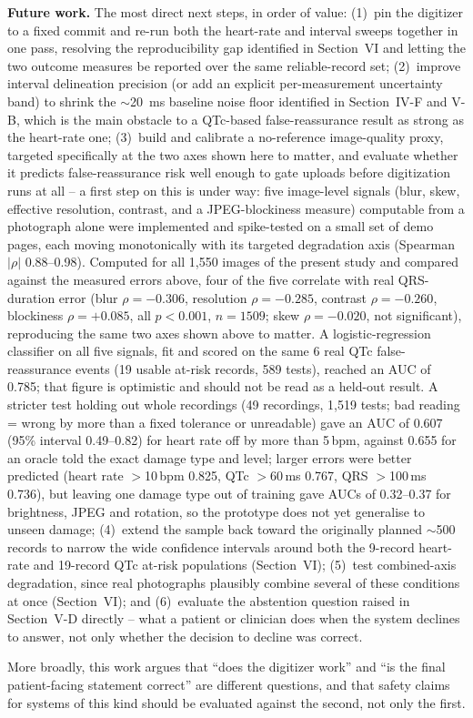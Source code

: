 \documentclass[conference]{IEEEtran}
\begin{document}
\textbf{Future work.} The most direct next steps, in order of value: (1)~pin the
digitizer to a fixed commit and re-run both the heart-rate and interval sweeps
together in one pass, resolving the reproducibility gap identified in Section~VI and
letting the two outcome measures be reported over the same reliable-record set;
(2)~improve interval delineation precision (or add an explicit per-measurement
uncertainty band) to shrink the $\sim$20~ms baseline noise floor identified in
Section~IV-F and V-B, which is the main obstacle to a QTc-based false-reassurance
result as strong as the heart-rate one; (3)~build and calibrate a no-reference
image-quality proxy, targeted specifically at the two axes shown here to matter, and
evaluate whether it predicts false-reassurance risk well enough to gate uploads
before digitization runs at all -- a first step on this is under way: five
image-level signals (blur, skew, effective resolution, contrast, and a JPEG-blockiness
measure) computable from a photograph alone were implemented and spike-tested on a
small set of demo pages, each moving monotonically with its targeted degradation
axis (Spearman $|\rho|$ 0.88--0.98). Computed for all 1,550 images of the present
study and compared against the measured errors above, four of the five correlate
with real QRS-duration error (blur $\rho=-0.306$, resolution $\rho=-0.285$, contrast
$\rho=-0.260$, blockiness $\rho=+0.085$, all $p<0.001$, $n=1509$; skew $\rho=-0.020$,
not significant), reproducing the same two axes shown above to matter. A
logistic-regression classifier on all five signals, fit and scored on the same 6
real QTc false-reassurance events (19 usable at-risk records, 589 tests), reached an
AUC of 0.785; that figure is optimistic and should not be read as a held-out result.
A stricter test holding out whole recordings (49 recordings, 1,519 tests; bad
reading = wrong by more than a fixed tolerance or unreadable) gave an AUC of 0.607
(95\% interval 0.49--0.82) for heart rate off by more than 5\,bpm, against 0.655 for
an oracle told the exact damage type and level; larger errors were better predicted
(heart rate $>$10\,bpm 0.825, QTc $>$60\,ms 0.767, QRS $>$100\,ms 0.736), but
leaving one damage type out of training gave AUCs of 0.32--0.37 for brightness, JPEG
and rotation, so the prototype does not yet generalise to unseen damage; (4)~extend the sample back toward the originally
planned $\sim$500 records to narrow the wide confidence intervals around both the
9-record heart-rate and 19-record QTc at-risk populations (Section~VI); (5)~test
combined-axis degradation, since real photographs plausibly combine several of these
conditions at once (Section~VI); and (6)~evaluate the abstention question raised in
Section~V-D directly -- what a patient or clinician does when the system declines to
answer, not only whether the decision to decline was correct.

More broadly, this work argues that ``does the digitizer work'' and ``is the final
patient-facing statement correct'' are different questions, and that safety claims
for systems of this kind should be evaluated against the second, not only the first.



\end{document}

